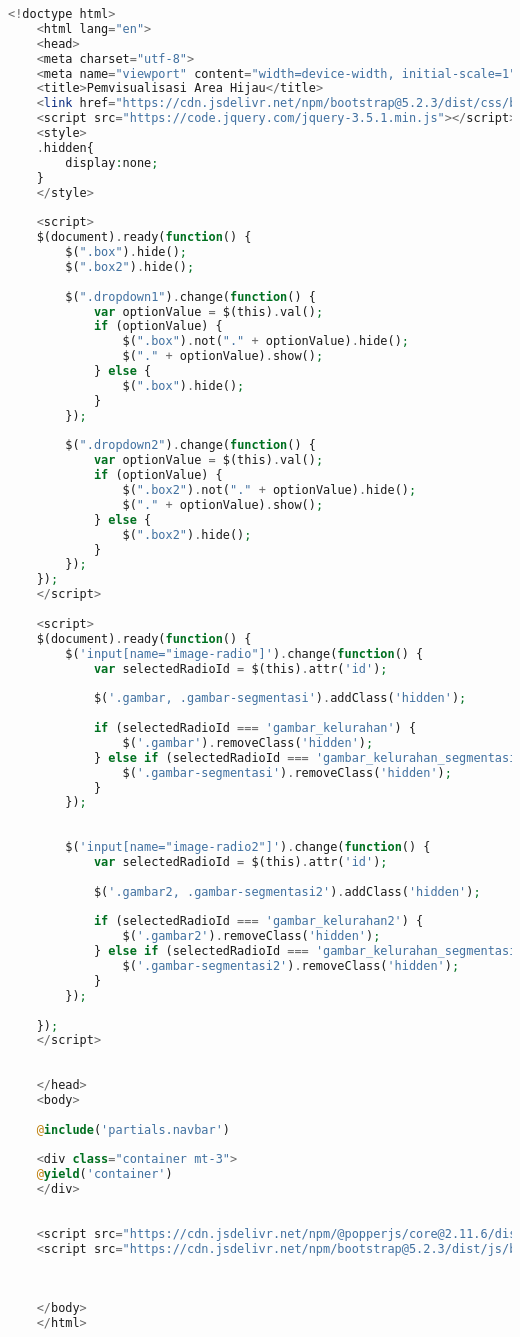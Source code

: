 \begin{lstlisting}[language=PHP, caption=main.blade.php]
	<!doctype html>
	<html lang="en">
	<head>
	<meta charset="utf-8">
	<meta name="viewport" content="width=device-width, initial-scale=1">
	<title>Pemvisualisasi Area Hijau</title>
	<link href="https://cdn.jsdelivr.net/npm/bootstrap@5.2.3/dist/css/bootstrap.min.css" rel="stylesheet" integrity="sha384-rbsA2VBKQhggwzxH7pPCaAqO46MgnOM80zW1RWuH61DGLwZJEdK2Kadq2F9CUG65" crossorigin="anonymous">
	<script src="https://code.jquery.com/jquery-3.5.1.min.js"></script>
	<style>
	.hidden{
		display:none;
	}
	</style>
	
	<script>
	$(document).ready(function() {
		$(".box").hide();
		$(".box2").hide();
		
		$(".dropdown1").change(function() {
			var optionValue = $(this).val();
			if (optionValue) {
				$(".box").not("." + optionValue).hide();
				$("." + optionValue).show();
			} else {
				$(".box").hide();
			}
		});
		
		$(".dropdown2").change(function() {
			var optionValue = $(this).val();
			if (optionValue) {
				$(".box2").not("." + optionValue).hide();
				$("." + optionValue).show();
			} else {
				$(".box2").hide();
			}
		});
	});
	</script>
	
	<script>
	$(document).ready(function() {
		$('input[name="image-radio"]').change(function() {
			var selectedRadioId = $(this).attr('id');
			
			$('.gambar, .gambar-segmentasi').addClass('hidden');
			
			if (selectedRadioId === 'gambar_kelurahan') {
				$('.gambar').removeClass('hidden');
			} else if (selectedRadioId === 'gambar_kelurahan_segmentasi') {
				$('.gambar-segmentasi').removeClass('hidden');
			}
		});
		
		
		$('input[name="image-radio2"]').change(function() {
			var selectedRadioId = $(this).attr('id');
			
			$('.gambar2, .gambar-segmentasi2').addClass('hidden');
			
			if (selectedRadioId === 'gambar_kelurahan2') {
				$('.gambar2').removeClass('hidden');
			} else if (selectedRadioId === 'gambar_kelurahan_segmentasi2') {
				$('.gambar-segmentasi2').removeClass('hidden');
			}
		});
		
	});
	</script>
	
	
	</head>
	<body>
	
	@include('partials.navbar')
	
	<div class="container mt-3">
	@yield('container')
	</div>
	
	
	<script src="https://cdn.jsdelivr.net/npm/@popperjs/core@2.11.6/dist/umd/popper.min.js" integrity="sha384-oBqDVmMz9ATKxIep9tiCxS/Z9fNfEXiDAYTujMAeBAsjFuCZSmKbSSUnQlmh/jp3" crossorigin="anonymous"></script>
	<script src="https://cdn.jsdelivr.net/npm/bootstrap@5.2.3/dist/js/bootstrap.min.js" integrity="sha384-cuYeSxntonz0PPNlHhBs68uyIAVpIIOZZ5JqeqvYYIcEL727kskC66kF92t6Xl2V" crossorigin="anonymous"></script>
	
	
	
	</body>
	</html>
	
\end{lstlisting}


